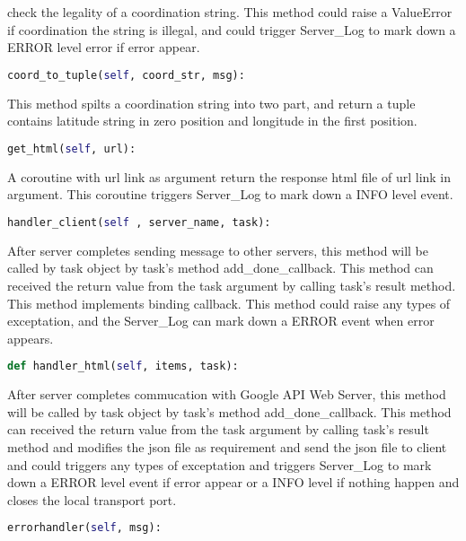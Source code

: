 \documentclass[10pt, a4paper]{IEEEtran}
\begin{document}
    check the legality of a coordination string. This method could raise a ValueError if coordination the string is illegal, and could trigger Server\_Log to mark down a ERROR level error if error appear.\\
    \begin{lstlisting}[language=python, frame=single, basicstyle=\footnotesize] 
        coord_to_tuple(self, coord_str, msg):
    \end{lstlisting}
    This method spilts a coordination string into two part, and return a tuple contains 
    latitude string in zero position and longitude in the first position.\\
    \begin{lstlisting}[language=python, frame=single, basicstyle=\footnotesize] 
        get_html(self, url):
    \end{lstlisting}
    A coroutine with url link as argument return the response html file of url link in argument. This coroutine triggers Server\_Log to mark down a INFO level event.\\
    \begin{lstlisting}[language=python, frame=single, basicstyle=\footnotesize] 
        handler_client(self , server_name, task):
    \end{lstlisting}
    After server completes sending message to other servers, this method will be called by task object by task's method add\_done\_callback. This method can received the return value from the task argument by calling task's result method. This method implements binding callback. This method could raise any types of exceptation, and the Server\_Log can mark down a ERROR event when error appears.\\
    \begin{lstlisting}[language=python, frame=single, basicstyle=\footnotesize] 
        def handler_html(self, items, task):
    \end{lstlisting}
    After server completes commucation with  Google API Web Server, this method will be called by task object by task's method add\_done\_callback. This method can received the return value from the task argument by calling task's result method and modifies the json file as requirement and send the json file to client and could triggers any types of exceptation and triggers Server\_Log to mark down a ERROR level event if error appear or a INFO level if nothing happen and closes the local transport port.\\
    \begin{lstlisting}[language=python, frame=single, basicstyle=\footnotesize] 
        errorhandler(self, msg):
    \end{lstlisting}
\end{document}
